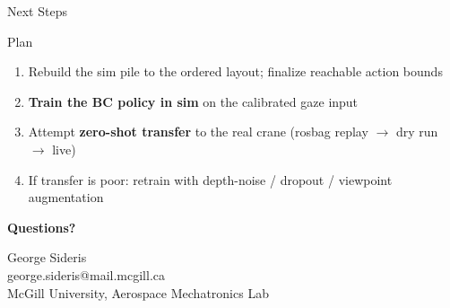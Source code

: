 \documentclass[aspectratio=169]{beamer}
\begin{document}
\begin{frame}{Next Steps}
\begin{block}{Plan}
  \footnotesize
  \begin{enumerate}\setlength{\itemsep}{3pt}
    \item Rebuild the sim pile to the ordered layout; finalize reachable action bounds
    \item \textbf{Train the BC policy in sim} on the calibrated gaze input
    \item Attempt \textbf{zero-shot transfer} to the real crane (rosbag replay $\to$ dry run $\to$ live)
    \item If transfer is poor: retrain with depth-noise / dropout / viewpoint augmentation
  \end{enumerate}
\end{block}
\end{frame}

\begin{frame}
  \centering
  \vspace{1.5cm}
  {\Huge\textbf{Questions?}}
  \vspace{8mm}

  {\large George Sideris}\\[3mm]
  {\small george.sideris@mail.mcgill.ca}\\[2mm]
  {\small McGill University, Aerospace Mechatronics Lab}\\[5mm]
\end{frame}
\end{document}
